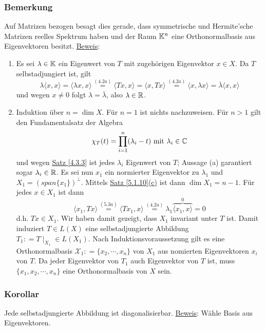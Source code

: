 \subsubsection{Bemerkung}
Auf Matrizen bezogen besagt dies gerade, dass symmetrische und Hermite'sche Matrizen reelles Spektrum haben und der Raum $\mathbb{K} ^n$ eine Orthonormalbasis aus Eigenvektoren besitzt.
\underline{Beweis}: 
\begin{enumerate}
\item Es sei $\lambda \in \mathbb{K}$ ein Eigenwert von $T$ mit zugehörigen Eigenvektor $x\in X$.  Da $T$ selbstadjungiert ist, gilt
\[\lambda \langle x,x\rangle = \langle \lambda x,x\rangle \stackrel{\hyperref[4.2a]{(4.2a)}}{=}\langle Tx,x\rangle = \langle x,Tx\rangle \stackrel{\hyperref[4.2a]{(4.2a)}}{=} \langle x,\lambda x\rangle = \overline{\lambda}\langle x,x\rangle\]
und wegen $x\not=0$ folgt $\lambda =\overline{\lambda}$, also $\lambda \in \mathbb{R}$.
\item Induktion über $n=\dim X$.  Für $n=1$ ist nichts nachzuweisen.  Für $n>1$ gilt den Fundamentalsatz der Algebra
\[\chi _T(t)=\prod _{i=1}^n(\lambda _i-t)\text{ mit }\lambda _i\in \mathbb{C}\]
und wegen \hyperref[4.3.3]{Satz \ref{4.3.3}} ist jedes $\lambda _i$ Eigenwert von $T$;
Aussage (a) garantiert sogar $\lambda _i\in \mathbb{R}$.  Es sei nun $x_1$ ein normierter Eigenvektor zu $\lambda _1$ und $X_1=(span\{x_1\})^\bot$.  Mittels \hyperref[5.1.10]{Satz \ref{5.1.10}(c)} ist dann $\dim X_1=n-1$.  Für jedes $x\in X_1$ ist dann
\[\langle x_1,Tx\rangle \stackrel{\hyperref[5.3a]{(5.3a)}}{=}\langle Tx_1,x\rangle \stackrel{\hyperref[4.2a]{(4.2a)}}{=}\lambda _1\overbrace{\langle x_1,x\rangle}^0=0\]
d.h. $Tx\in X_1$.  Wir haben damit gezeigt, dass $X_1$ invariant unter $T$ ist.  Damit induziert $T\in L(X)$ eine selbstadjungierte Abbildung $T_1\colon =T\mid _{X_1}\in L(X_1)$.  Nach Induktionsvoraussetzung gilt es eine Orthonormalbasis $\mathcal{X}_1\colon =\{x_2,\cdots ,x_n\}$ von $X_1$ aus nomierten Eigenvektoren $x_i$ von $T$.  Da jeder Eigenvektor von $T_1$ auch Eigenvektor von $T$ ist, muss $\{x_1,x_2,\cdots ,x_n\}$ eine Orthonormalbasis von $X$ sein.
\end{enumerate}
\subsubsection{Korollar}
Jede selbstadjungierte Abbildung ist diagonalisierbar.
\underline{Beweis}: Wähle Basis aus Eigenvektoren.